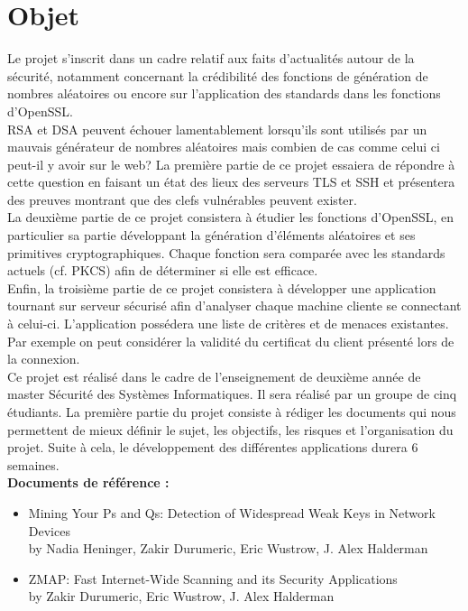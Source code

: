\documentclass[a4paper,11pt,french]{article}
\begin{document}
\section{Objet}
Le projet s'inscrit dans un cadre relatif aux faits d'actualités autour de la sécurité, notamment concernant la crédibilité des fonctions de génération de nombres aléatoires ou encore  sur l’application des standards dans les fonctions d’OpenSSL.\\

RSA et DSA peuvent échouer lamentablement lorsqu’ils sont utilisés par un mauvais générateur de nombres aléatoires mais combien de cas comme celui ci peut-il y avoir sur le web? La première partie de ce projet essaiera de répondre à cette question en faisant un état des lieux des serveurs TLS et SSH et présentera des preuves montrant que des clefs vulnérables peuvent exister.\\

La deuxième partie de ce projet consistera à étudier les fonctions d’OpenSSL, en particulier sa partie développant la génération d’éléments aléatoires et ses primitives cryptographiques. Chaque fonction sera comparée avec les standards actuels (cf. PKCS) afin de déterminer si elle est efficace.\\

Enfin, la troisième partie de ce projet consistera à développer une application tournant sur serveur sécurisé afin d’analyser chaque machine cliente se connectant à celui-ci. L’application possédera une liste de critères et de menaces existantes. Par exemple on peut considérer la validité du certificat du client présenté lors de la connexion.\\


Ce projet est réalisé dans le cadre de l’enseignement de deuxième année de master Sécurité des Systèmes Informatiques. Il sera réalisé par un groupe de cinq étudiants. La première partie du projet consiste à rédiger les documents qui nous permettent de mieux définir le sujet, les objectifs, les risques et l’organisation du projet. Suite à cela, le développement des différentes applications durera 6 semaines. \\

\textbf{Documents de référence :}
\begin{itemize}
  \item Mining Your Ps and Qs: Detection of Widespread Weak Keys in Network Devices \\
  		{by Nadia Heninger, Zakir Durumeric, Eric Wustrow, J. Alex Halderman}
  \item ZMAP: Fast Internet-Wide Scanning and its Security Applications\\
  		{by Zakir Durumeric, Eric Wustrow, J. Alex Halderman}
\end{itemize}
\end{document}
